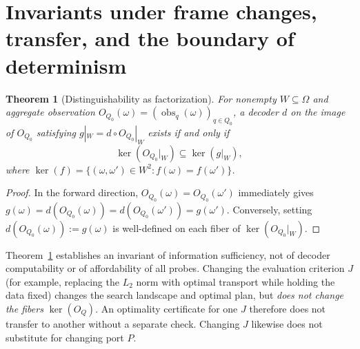 \documentclass[11pt,a4paper]{article}
\theoremstyle{preprintthm}
\newtheorem{theorem}{Theorem}[section]
\theoremstyle{preprintdef}
\newcommand{\kerrel}{\operatorname{ker}}
\newcommand{\obs}{\operatorname{obs}}
\begin{document}
\section{Invariants under frame changes, transfer, and the boundary of determinism}

\begin{theorem}[Distinguishability as factorization]
\label{thm:factorization}
For nonempty $W\subseteq\Omega$ and aggregate observation $O_{Q_0}(\omega)=(\obs_q(\omega))_{q\in Q_0}$, a decoder $d$ on the image of $O_{Q_0}$ satisfying $g|_W=d\circ O_{Q_0}|_W$ exists if and only if
\begin{equation}
  \kerrel(O_{Q_0}|_W) \subseteq \kerrel(g|_W),
\end{equation}
where $\kerrel(f)=\{(\omega,\omega')\in W^2:f(\omega)=f(\omega')\}$.
\end{theorem}
\begin{proof}
In the forward direction, $O_{Q_0}(\omega)=O_{Q_0}(\omega')$ immediately gives $g(\omega)=d(O_{Q_0}(\omega))=d(O_{Q_0}(\omega'))=g(\omega')$. Conversely, setting $d(O_{Q_0}(\omega)):=g(\omega)$ is well-defined on each fiber of $\kerrel(O_{Q_0}|_W)$.
\end{proof}

Theorem~\ref{thm:factorization} establishes an invariant of information sufficiency, not of decoder computability or of affordability of all probes. Changing the evaluation criterion $J$ (for example, replacing the $L_2$ norm with optimal transport while holding the data fixed) changes the search landscape and optimal plan, but \emph{does not change the fibers} $\kerrel(O_Q)$. An optimality certificate for one $J$ therefore does not transfer to another without a separate check. Changing $J$ likewise does not substitute for changing port $P$.
\end{document}
